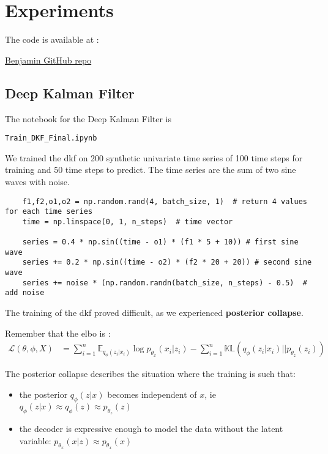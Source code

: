 \chapter{Experiments}

The code is available at : 

\begin{tcolorbox}[colback=blue!5!white,colframe=black!75!black,title=GitHub repo]
    \href{https://github.com/BenjaminDeporte/MVA_Stage}{Benjamin GitHub repo}
\end{tcolorbox}

\section{Deep Kalman Filter}

The notebook for the Deep Kalman Filter is 

\begin{verbatim}
Train_DKF_Final.ipynb
\end{verbatim}

We trained the \gls{dkf} on 200 synthetic univariate time series of 100 time steps for training and 50 time steps to predict. 
The time series are the sum of two sine waves with noise.

\begin{verbatim}
    f1,f2,o1,o2 = np.random.rand(4, batch_size, 1)  # return 4 values for each time series
    time = np.linspace(0, 1, n_steps)  # time vector
    
    series = 0.4 * np.sin((time - o1) * (f1 * 5 + 10)) # first sine wave
    series += 0.2 * np.sin((time - o2) * (f2 * 20 + 20)) # second sine wave
    series += noise * (np.random.randn(batch_size, n_steps) - 0.5)  # add noise
\end{verbatim}

The training of the \gls{dkf} proved difficult, as we experienced \textbf{posterior collapse}.

Remember that the \gls{elbo} is :
\begin{align*}
    \mathcal{L}(\theta, \phi, X) &= \sum_{i=1}^n \mathbb{E}_{q_{\phi}(z_i \vert x_i)} \log{p_{\theta_x}(x_i \vert z_i)} - \sum_{i=1}^n \mathbb{KL}(q_{\phi}(z_i \vert x_i) \vert\vert p_{\theta_z}(z_i) )
\end{align*}

The posterior collapse describes the situation where the training is such that:
\begin{itemize}
    \item the posterior $q_{\phi}(z \vert x)$ becomes independent of $x$, ie $q_{\phi}(z \vert x) \approx q_{\phi}(z) \approx p_{\theta_z}(z)$
    \item the decoder is expressive enough to model the data without the latent variable: $p_{\theta_x}(x \vert z) \approx p_{\theta_x}(x)$
\end{itemize}

